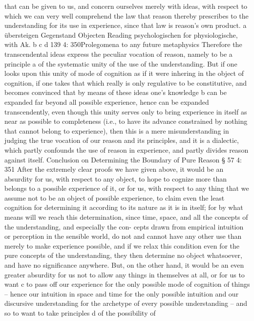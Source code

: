 that can be given to us, and concern ourselves merely with ideas, with respect
to which we can very well comprehend the law that reason thereby prescribes
to the understanding for its use in experience, since that law is reason’s own
product.
a übersteigen
Gegenstand
Objecten
Reading psychologischen for physiologische, with Ak.
b
c
d
139
4: 350Prolegomena to any future metaphysics
Therefore the transcendental ideas express the peculiar vocation of
reason, namely to be a principle a of the systematic unity of the use of
the understanding. But if one looks upon this unity of mode of cognition
as if it were inhering in the object of cognition, if one takes that which
really is only regulative to be constitutive, and becomes convinced that by
means of these ideas one’s knowledge b can be expanded far beyond all
possible experience, hence can be expanded transcendently, even though
this unity serves only to bring experience in itself as near as possible to
completeness (i.e., to have its advance constrained by nothing that cannot
belong to experience), then this is a mere misunderstanding in judging
the true vocation of our reason and its principles, and it is a dialectic,
which partly confounds the use of reason in experience, and partly divides
reason against itself.
Conclusion
on
Determining the Boundary of Pure Reason
§ 57
4: 351
After the extremely clear proofs we have given above, it would be an
absurdity for us, with respect to any object, to hope to cognize more
than belongs to a possible experience of it, or for us, with respect to any
thing that we assume not to be an object of possible experience, to claim
even the least cognition for determining it according to its nature as it is
in itself; for by what means will we reach this determination, since time,
space, and all the concepts of the understanding, and especially the con-
cepts drawn from empirical intuition or perception in the sensible world,
do not and cannot have any other use than merely to make experience
possible, and if we relax this condition even for the pure concepts of the
understanding, they then determine no object whatsoever, and have no
signiﬁcance anywhere.
But, on the other hand, it would be an even greater absurdity for us
not to allow any things in themselves at all, or for us to want c to pass
off our experience for the only possible mode of cognition of things –
hence our intuition in space and time for the only possible intuition
and our discursive understanding for the archetype of every possible
understanding – and so to want to take principles d of the possibility of
